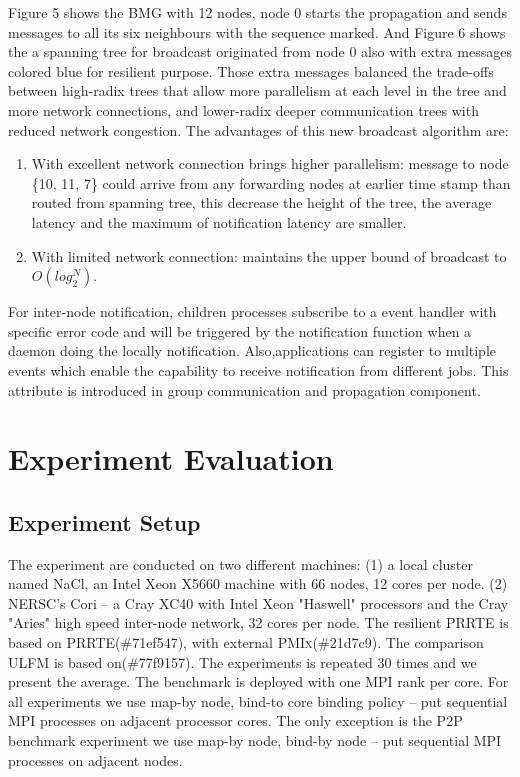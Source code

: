 \documentclass[sigconf]{acmart}
\newcommand{\prrte}[0]{\textsc{PRRTE}\xspace}
\newcommand{\pmix}[0]{\textsc{PMIx}\xspace}
\newcommand{\ulfm}[0]{\textsc{ULFM}\xspace}
\newcommand{\mpi}[0]{\textsc{MPI}\xspace}
\begin{document}
Figure 5 shows the BMG with 12 nodes, node 0 starts the propagation and sends messages to all its six neighbours with the sequence marked. And Figure 6 shows the a spanning tree for broadcast originated from node 0 also with extra messages colored blue for resilient purpose. Those extra messages balanced the trade-offs between high-radix trees that allow more parallelism at each level in the tree and more network connections, and lower-radix deeper communication trees with reduced network congestion. The advantages of this new broadcast algorithm are:
\begin{enumerate}
  \item With excellent network connection brings higher parallelism: message to node \{10, 11, 7\} could arrive from any forwarding nodes at earlier time stamp than routed from spanning tree, this decrease the height of the tree, the average latency and the maximum of notification latency are smaller.
  \item With limited network connection: maintains the upper bound of broadcast to $O(log_2^{N})$. 
\end{enumerate}
For inter-node notification, children processes subscribe to a event handler with specific error code and will be triggered by the notification function when a daemon doing the locally notification. Also,applications can register to multiple events which enable the capability to receive notification from different jobs. This attribute is introduced in group communication and propagation component.

\section{Experiment Evaluation}\label{sec:experiments}

\subsection{Experiment Setup}
The experiment are conducted on two different machines: (1) a local cluster named NaCl, an Intel Xeon X5660 machine with 66 nodes, 12 cores per node. (2) NERSC's Cori
-- a Cray XC40 with Intel Xeon "Haswell" processors and the Cray "Aries" high speed inter-node network, 32 cores per node. The resilient \prrte is based on \prrte(\#71ef547), with external \pmix(\#21d7c9). The comparison \ulfm is based on(\#77f9157). The experiments is repeated 30 times and we present the average. The benchmark is deployed with one \mpi rank per core. For all experiments we use map-by node, bind-to core binding policy -- put sequential MPI processes on adjacent processor cores. The only exception is the P2P benchmark experiment we use map-by node, bind-by node -- put sequential MPI processes on adjacent nodes. 
\end{document}
